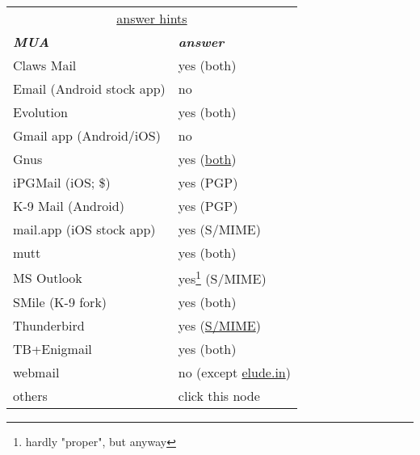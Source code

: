 \documentclass[12pt]{scrartcl}
\begin{document}
\begin{preview}
  \fontsize{4mm}{4mm}\selectfont 
  \begin{minipage}{6cm} %
    \begin{tabular}{lp{26mm}}
      \multicolumn{2}{|c|}{\underline{answer hints}}\\
      \textsl{\textbf{MUA}}          & \textsl{\textbf{answer}}\\
      Claws Mail                     & yes (both)\\
      Email \tiny(Android stock app) & no\\
      Evolution                      & yes (both)\\
      Gmail app \tiny(Android/iOS)   & no\\
      Gnus                           & yes (\href{https://www.emacswiki.org/emacs/GnusSMIME}{both})\\
      iPGMail \tiny(iOS; \$)         & yes (PGP)\\
      K-9 Mail \tiny(Android)        & yes (PGP)\\
      mail.app \tiny(iOS stock app)  & yes (S/MIME)\\
      mutt                           & yes (both)\\
      MS Outlook                     & yes\footnote[$\star$]{hardly "proper", but anyway} (S/MIME)\\
      SMile \tiny(K-9 fork)          & yes (both)\\
      Thunderbird                    & yes (\href{http://kb.mozillazine.org/Installing_an_SMIME_certificate}{S/MIME})\\
      TB+Enigmail                    & yes (both)\\
      webmail                        & no \tiny(except \href{eludemaillhqfkh5.onion}{elude.in})\\
      others                         & click this node\\
    \end{tabular}
  \end{minipage}
\end{preview}
\end{document}
